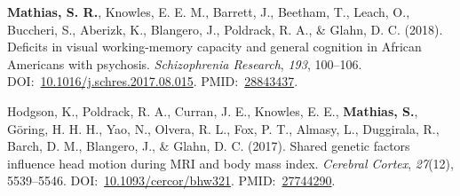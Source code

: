 \documentclass[10pt]{article}
\makeatletter
\newlength{\bibhang}
\newlength{\bibsep}
 {\@listi \global\bibsep\itemsep \global\advance\bibsep by\parsep}
\newenvironment{bibsection}%
        {\vspace{-\baselineskip}\begin{list}{}{%
       \setlength{\leftmargin}{\bibhang}%
       \setlength{\itemindent}{-\leftmargin}%
       \setlength{\itemsep}{\bibsep}%
       \setlength{\parsep}{\z@}%
        \setlength{\partopsep}{0pt}%
        \setlength{\topsep}{0pt}}}
        {\end{list}\vspace{-.6\baselineskip}}
\makeatother
\begin{document}
\begin{bibsection}
\item \textbf{Mathias, S. R.}, Knowles, E. E. M., Barrett, J., Beetham, T., Leach, O., Buccheri, S., Aberizk, K., Blangero, J., Poldrack, R. A., \& Glahn, D. C. (2018). Deficits in visual working-memory capacity and general cognition in African Americans with psychosis. \emph{Schizophrenia Research}, \emph{193}, 100--106. DOI:~\href{https://doi.org/10.1016/j.schres.2017.08.015}{10.1016/j.schres.2017.08.015}. PMID:~\href{https://www.ncbi.nlm.nih.gov/pubmed/?term=28843437}{28843437}.
\item Hodgson, K., Poldrack, R. A., Curran, J. E., Knowles, E. E., \textbf{Mathias, S.}, Göring, H. H. H., Yao, N., Olvera, R. L., Fox, P. T., Almasy, L., Duggirala, R., Barch, D. M., Blangero, J., \& Glahn, D. C. (2017). Shared genetic factors influence head motion during MRI and body mass index. \emph{Cerebral Cortex}, \emph{27}(12), 5539--5546. DOI:~\href{https://doi.org/10.1093/cercor/bhw321}{10.1093/cercor/bhw321}. PMID:~\href{https://www.ncbi.nlm.nih.gov/pubmed/?term=27744290}{27744290}.

\end{bibsection}
\end{document}
